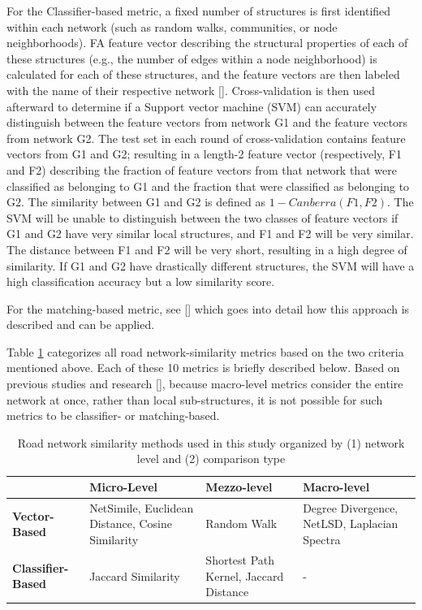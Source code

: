 For the Classifier-based metric,  a fixed number of structures is first identified within each network (such as random walks, communities, or node neighborhoods). FA feature vector describing the structural properties of each of these structures (e.g., the number of edges within a node neighborhood) is calculated for each of these structures, and the feature vectors are then labeled with the name of their respective network [\cite{Soundarajan:2014}]. Cross-validation is then used afterward to determine if a Support vector machine (SVM) can accurately distinguish between the feature vectors from network G1 and the feature vectors from network G2. The test set in each round of cross-validation contains feature vectors from G1 and G2; resulting in a length-2 feature vector (respectively, F1 and F2) describing the fraction of feature vectors from that network that were classified as belonging to G1 and the fraction that were classified as belonging to G2. The similarity between G1 and G2 is defined as $1-Canberra(F1, F2)$. The SVM will be unable to distinguish between the two classes of feature vectors if G1 and G2 have very similar local structures, and F1 and F2 will be very similar. The distance between F1 and F2 will be very short, resulting in a high degree of similarity. If G1 and G2 have drastically different structures, the SVM will have a high classification accuracy but a low similarity score.

For the matching-based metric, see [\cite{Soundarajan:2014}] which goes into detail how this approach is described and can be applied. 

Table \ref{tab:Road Network Similarity Methods} categorizes all road network-similarity metrics based on the two criteria mentioned above. Each of these 10 metrics is briefly described below. Based on previous studies and research [\cite{Soundarajan:2014}], because macro-level metrics consider the entire network at once, rather than local sub-structures, it is not possible for such metrics to be classifier- or matching-based.

\begin{table}[!h]
\centering
\begin{tabular}{|p{3cm}|p{3cm}|p{3cm}|p{3cm}|}
\hline
& \textbf{Micro-Level} & \textbf{Mezzo-level} & \textbf{Macro-level} \\ \hline
\textbf{Vector-Based} & NetSimile, Euclidean Distance, Cosine Similarity  & Random Walk & Degree Divergence, NetLSD, Laplacian Spectra \\ \hline
\textbf{Classifier-Based} & Jaccard Similarity & Shortest Path Kernel, Jaccard Distance  & - \\ \hline
\end{tabular}
\caption{Road network similarity methods used in this study organized by (1) network level and (2) comparison type}
\label{tab:Road Network Similarity Methods}
\end{table}

